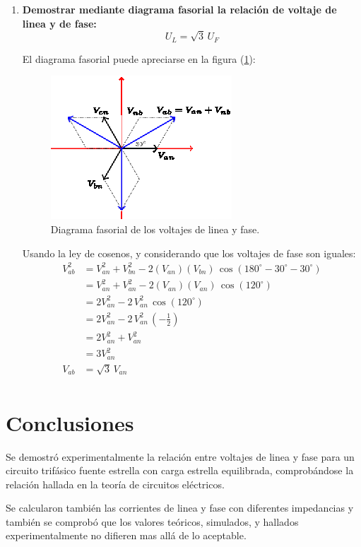 \documentclass[letter,11pt]{article}
\begin{document}
\begin{enumerate}
\item \textbf{Demostrar mediante diagrama fasorial la relación de voltaje de
linea y de fase:}
\begin{equation*}
    U_L=\sqrt{3}\,U_F
\end{equation*}

El diagrama fasorial puede apreciarse en la figura (\ref{simulacion7}):
\begin{figure}[!h]
\centering
\includegraphics[scale=2.5]{figura1.eps}
\caption{Diagrama fasorial de los voltajes de linea y fase.}
\label{simulacion7}
\end{figure}

Usando la ley de cosenos, y considerando que los voltajes de fase son iguales:
\begin{equation*}
    \begin{split}
        V_{ab}^2&=V_{an}^2+V_{bn}^2-2(V_{an})(V_{bn})\,\cos(180^\circ-30^\circ-30^\circ)\\
                &=V_{an}^2+V_{an}^2-2(V_{an})(V_{an})\,\cos(120^\circ)\\
                &=2V_{an}^2-2\,V_{an}^2\,\cos(120^\circ)\\
                &=2V_{an}^2-2\,V_{an}^2\,(-\frac{1}{2})\\
                &=2V_{an}^2+V_{an}^2\\
                &=3V_{an}^2\\
          V_{ab}&=\sqrt{3}\,V_{an}\\
    \end{split}
\end{equation*}

\end{enumerate}

\section{Conclusiones}
Se demostró experimentalmente la relación entre voltajes de linea y fase para 
un circuito trifásico fuente estrella con carga estrella equilibrada,
comprobándose la relación hallada en la teoría de circuitos eléctricos.

Se calcularon también las corrientes de linea y fase con diferentes impedancias
y también se comprobó que los valores teóricos, simulados, y hallados
experimentalmente no difieren mas allá de lo aceptable.
\end{document}
